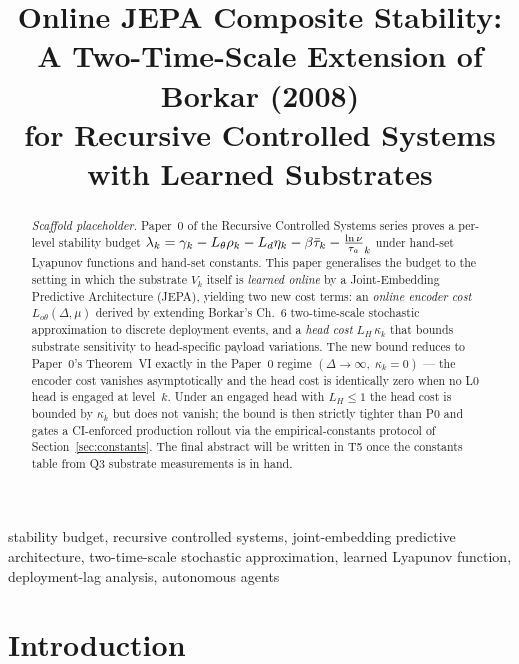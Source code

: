 \documentclass[conference]{IEEEtran}
\title{Online JEPA Composite Stability:\\
A Two-Time-Scale Extension of Borkar (2008)\\
for Recursive Controlled Systems with Learned Substrates}
\author{
  \IEEEauthorblockN{Carlos D. Escobar-Valbuena}
  \IEEEauthorblockA{
    Broomva Research\\
    Bogot\'a, Colombia\\
    carlosdavidescobar@gmail.com
  }
}
\newcommand{\headlip}{L_H}
\newcommand{\onlineenc}{L_{o\theta}}
\newcommand{\deplag}{\Delta}
\newcommand{\klcoef}{\mu}
\newcommand{\headvar}{\kappa}
\begin{document}
\maketitle

\begin{abstract}
\emph{Scaffold placeholder.} Paper~0 of the Recursive Controlled Systems
series proves a per-level stability budget
$\lambda_k = \gamma_k - L_\theta \rho_k - L_d \eta_k - \beta \bar{\tau}_k - \frac{\ln \nu}{\tau_a}_k$ under
hand-set Lyapunov functions and hand-set constants. This paper generalises
the budget to the setting in which the substrate $V_k$ itself is
\emph{learned online} by a Joint-Embedding Predictive Architecture (JEPA),
yielding two new cost terms: an \emph{online encoder cost}
$\onlineenc(\deplag, \klcoef)$ derived by extending Borkar's Ch.~6
two-time-scale stochastic approximation to discrete deployment events, and
a \emph{head cost} $\headlip\,\headvar_k$ that bounds substrate
sensitivity to head-specific payload variations. The new bound reduces to
Paper~0's Theorem~VI exactly in the Paper~0 regime
$(\deplag\to\infty,\;\headvar_k = 0)$ --- the encoder cost vanishes
asymptotically and the head cost is identically zero when no L0 head is
engaged at level~$k$. Under an engaged head with $\headlip \le 1$ the
head cost is bounded by $\headvar_k$ but does not vanish; the bound is
then strictly tighter than P0 and gates a CI-enforced production rollout
via the empirical-constants protocol of Section~\ref{sec:constants}. The
final abstract will be written in T5 once the constants table from Q3
substrate measurements is in hand.
\end{abstract}

\begin{IEEEkeywords}
  stability budget, recursive controlled systems, joint-embedding predictive
  architecture, two-time-scale stochastic approximation, learned Lyapunov
  function, deployment-lag analysis, autonomous agents
\end{IEEEkeywords}

\section{Introduction}
\label{sec:introduction}
\end{document}
